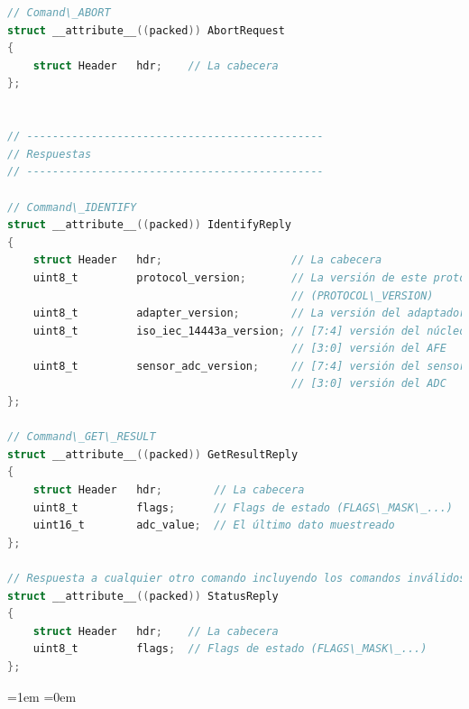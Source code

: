 \documentclass[a4paper, twoside, 11pt]{report}
\begin{document}
\begin{lstlisting}[language=C, style=CStyle, texcl=true]
// Comand\_ABORT
struct __attribute__((packed)) AbortRequest
{
    struct Header   hdr;    // La cabecera
};


// ----------------------------------------------
// Respuestas
// ----------------------------------------------

// Command\_IDENTIFY
struct __attribute__((packed)) IdentifyReply
{
    struct Header   hdr;                    // La cabecera
    uint8_t         protocol_version;       // La versión de este protocolo
                                            // (PROTOCOL\_VERSION)
    uint8_t         adapter_version;        // La versión del adaptador (adapter.sv)
    uint8_t         iso_iec_14443a_version; // [7:4] versión del núcleo IP digital
                                            // [3:0] versión del AFE
    uint8_t         sensor_adc_version;     // [7:4] versión del sensor
                                            // [3:0] versión del ADC
};

// Command\_GET\_RESULT
struct __attribute__((packed)) GetResultReply
{
    struct Header   hdr;        // La cabecera
    uint8_t         flags;      // Flags de estado (FLAGS\_MASK\_...)
    uint16_t        adc_value;  // El último dato muestreado
};

// Respuesta a cualquier otro comando incluyendo los comandos inválidos.
struct __attribute__((packed)) StatusReply
{
    struct Header   hdr;    // La cabecera
    uint8_t         flags;  // Flags de estado (FLAGS\_MASK\_...)
};
\end{lstlisting}



\FloatBarrier
\newpage

\emergencystretch=1em
\printbibliography
\emergencystretch=0em
\end{document}

